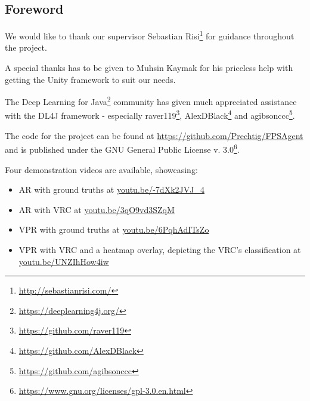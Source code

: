 
\begin{center}
\section*{Foreword}
\vspace{1em}
\end{center}


\noindent
We would like to thank our supervisor Sebastian Risi\footnote{\url{http://sebastianrisi.com/}} for guidance throughout the project.

A special thanks has to be given to Muhsin Kaymak for his priceless help with getting the Unity framework to suit our needs.

The Deep Learning for Java\footnote{\url{https://deeplearning4j.org/}} community has given much appreciated assistance with the DL4J framework - especially raver119\footnote{\url{https://github.com/raver119}}, AlexDBlack\footnote{\url{https://github.com/AlexDBlack}} and agibsonccc\footnote{\url{https://github.com/agibsonccc}}.

\vspace{5mm}

\noindent
The code for the project can be found at \url{https://github.com/Prechtig/FPSAgent} and is published under the GNU General Public License v. 3.0\footnote{\url{https://www.gnu.org/licenses/gpl-3.0.en.html}}.

\vspace{5mm}

\noindent
Four demonstration videos are available, showcasing:
\begin{itemize}
  \item AR with ground truths at \url{youtu.be/-7dXk2JVJ_4}
  \item AR with VRC at \url{youtu.be/3qO9vd3SZqM}
  \item VPR with ground truths at \url{youtu.be/6PqhAdITsZo}
  \item VPR with VRC and a heatmap overlay, depicting the VRC's classification at \url{youtu.be/UNZIhHow4iw} 
\end{itemize}

\restoregeometry








